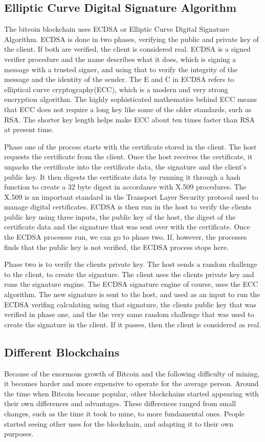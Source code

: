 \documentclass[12pt]{article}
\begin{document}
\subsection{Elliptic Curve Digital Signature Algorithm}
The bitcoin blockchain uses ECDSA or Elliptic Curve Digital Signature Algorithm. ECDSA is done in two phases, verifying the public and private key of the client. If both are verified, the client is considered real. ECDSA is a signed verifier procedure and the name describes what it does, which is signing a message with a trusted signer, and using that to verify the integrity of the message and the identity of the sender. The E and C in ECDSA refers to elliptical curve cryptography(ECC), which is a modern and very strong encryption algorithm. The highly sophisticated mathematics behind ECC means that ECC does not require a long key like some of the older standards, such as RSA. The shorter key length helps make ECC about ten times faster than RSA\cite{jansma2004performance} at present time. 

Phase one of the process starts with the certificate stored in the client. The host requests the certificate from the client. Once the host receives the certificate, it unpacks the certificate into the certificate data, the signature and the client's public key. It then digests the certificate data by running it through a hash function to create a 32 byte digest in accordance with X.509 procedures. The X.509 is an important standard in the Transport Layer Security protocol used to manage digital certificates. ECDSA is then run in the host to verify the clients public key using three inputs, the public key of the host, the digest of the certificate data and the signature that was sent over with the certificate. Once the ECDSA processes run, we can go to phase two. If, however, the processes finds that the public key is not verified, the ECDSA process stops here.

Phase two is to verify the clients private key. The host sends a random challenge to the client, to create the signature. The client uses the clients private key and runs the signature engine. The ECDSA signature engine of course, uses the ECC algorithm. The new signature is sent to the host, and used as an input to run the ECDSA verifing calculating using that signature, the clients public key that was verified in phase one, and the the very same random challenge that was used to create the signature in the client. If it passes, then the client is considered as real. 

\subsection{Different Blockchains}\label{subsec:difblocks}
Because of the enormous growth of Bitcoin and the following difficulty of mining, it becomes harder and more expensive to operate for the average person. Around the time when Bitcoin became popular, other blockchains started appearing with their own differences and advantages. These differences ranged from small changes, such as the time it took to mine, to more fundamental ones. People started seeing other uses for the blockchain, and adapting it to their own purposes. 
\end{document}
